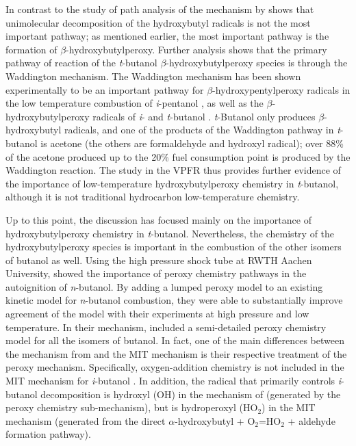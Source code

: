 \documentclass[12pt, letterpaper]{article}
\begin{document}
In contrast to the study of \textcite{Lefkowitz2012} path analysis of the
mechanism by \textcite{Sarathy2012} shows that unimolecular decomposition
of the hydroxybutyl radicals is not the most important pathway; as mentioned
earlier, the most important pathway is the formation of
$\beta$-hydroxybutylperoxy. Further analysis shows that the primary pathway of
reaction of the \textit{t}-butanol $\beta$-hydroxybutylperoxy species is
through the Waddington mechanism. The Waddington mechanism has been shown
experimentally to be an important pathway for $\beta$-hydroxypentylperoxy
radicals in the low temperature combustion of \textit{i}-pentanol
\cite{Welz2012}, as well as the $\beta$-hydroxybutylperoxy radicals of
\textit{i}- and \textit{t}-butanol \cite{Welz2013b}. \textit{t}-Butanol only
produces $\beta$-hydroxybutyl radicals, and one of the products of the
Waddington pathway in \textit{t}-butanol is acetone (the others are
formaldehyde and hydroxyl radical); over 88\% of the acetone produced up to the
20\% fuel consumption point is produced by the Waddington reaction. The study
in the VPFR thus provides further evidence of the importance of low-temperature
hydroxybutylperoxy chemistry in \textit{t}-butanol, although it is not
traditional hydrocarbon low-temperature chemistry.

Up to this point, the discussion has focused mainly on the importance of
hydroxybutylperoxy chemistry in \textit{t}-butanol. Nevertheless, the chemistry
of the hydroxybutylperoxy species is important in the combustion of the other
isomers of butanol as well. Using the high pressure shock tube at RWTH Aachen
University, \textcite{Vranckx2011} showed the importance of peroxy chemistry
pathways in the autoignition of \textit{n}-butanol. By adding a lumped peroxy
model to an existing kinetic model for \textit{n}-butanol combustion, they were
able to substantially improve agreement of the model with their experiments at
high pressure and low temperature. In their mechanism, \textcite{Sarathy2012}
included a semi-detailed peroxy chemistry model for all the isomers of butanol.
In fact, one of the main differences between the mechanism from
\textcite{Sarathy2012} and the MIT mechanism \cite{Hansen2013,Merchant2013} is
their respective treatment of the peroxy mechanism. Specifically,
oxygen-addition chemistry is not included in the MIT mechanism for
\textit{i}-butanol \cite{Hansen2013,Merchant2013}. In addition, the radical
that primarily controls \textit{i}-butanol decomposition is hydroxyl (OH) in
the mechanism of \textcite{Sarathy2012} (generated by the peroxy chemistry
sub-mechanism), but is hydroperoxyl (HO$_2$) in the MIT mechanism
\cite{Hansen2013,Merchant2013} (generated from the direct $\alpha$-hydroxybutyl
+ O$_2$=HO$_2$ + aldehyde formation pathway).
\end{document}
